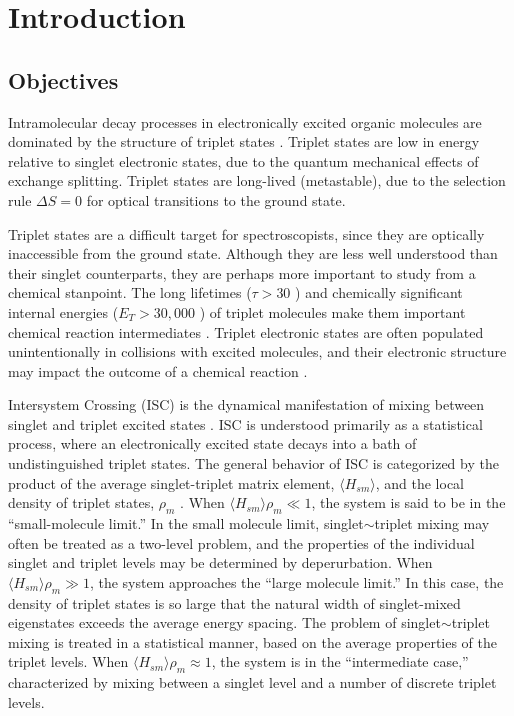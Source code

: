 \documentclass[12pt]{mitthesis}
\begin{document}
\tableofcontents
\clearpage

\chapter{Introduction}
\label{chapter:intro}

\section{Objectives}

Intramolecular decay processes in electronically excited organic
molecules are dominated by the structure of triplet states
\cite{mcglynn69, medvedev95}.  Triplet states are low in energy
relative to singlet electronic states, due to the quantum mechanical
effects of exchange splitting.  Triplet states are long-lived
(metastable), due to the selection rule $\Delta S = 0$ for optical
transitions to the ground state.

Triplet states are a difficult target for spectroscopists, since they
are optically inaccessible from the ground state.  Although they are
less well understood than their singlet counterparts, they are perhaps
more important to study from a chemical stanpoint.  The long lifetimes
($\tau > 30$ \microsec) and chemically significant internal energies
($E_T > 30,000$ \rcm) of triplet molecules make them important
chemical reaction intermediates \cite{calvert66}.  Triplet electronic
states are often populated unintentionally in collisions with excited
molecules, and their electronic structure may impact the outcome of a
chemical reaction \cite{woodward71}.


Intersystem Crossing (ISC) is the dynamical manifestation of mixing
between singlet and triplet excited states \cite{robinson67,
  kommandeur87, lombardi88, tramer05}.  ISC is understood primarily as
a statistical process, where an electronically excited state decays
into a bath of undistinguished triplet states.  The general behavior
of ISC is categorized by the product of the average singlet-triplet
matrix element, $\langle H_{sm} \rangle$, and the local density of
triplet states, $\rho_m$ \cite{robinson67, kommandeur87, freed76}.  When
$\langle H_{sm} \rangle \rho_m \ll 1$, the system is said to be in the
``small-molecule limit.''  In the small molecule limit,
singlet$\sim$triplet mixing may often be treated as a two-level
problem, and the properties of the individual singlet and triplet
levels may be determined by deperurbation.  When $\langle H_{sm}
\rangle \rho_m \gg 1$, the system approaches the ``large molecule
limit.''  In this case, the density of triplet states is so large that
the natural width of singlet-mixed eigenstates exceeds the average
energy spacing.  The problem of singlet$\sim$triplet mixing is treated
in a statistical manner, based on the average properties of the
triplet levels.  When $\langle H_{sm} \rangle \rho_m \approx 1$, the
system is in the ``intermediate case,'' characterized by mixing
between a singlet level and a number of discrete triplet levels.
\end{document}
